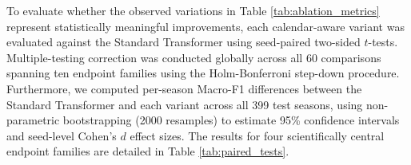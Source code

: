\documentclass[runningheads]{llncs}
\begin{document}
\begin{table}[h!]
\centering
\caption{Ten-seed ablation metrics (mean $\pm$ sample standard deviation) across calendar-aware variants on the 399-season test partition.}
\label{tab:ablation_metrics}
\end{table}

To evaluate whether the observed variations in Table \ref{tab:ablation_metrics} represent statistically meaningful improvements, each calendar-aware variant was evaluated against the Standard Transformer using seed-paired two-sided $t$-tests. Multiple-testing correction was conducted globally across all 60 comparisons spanning ten endpoint families using the Holm-Bonferroni step-down procedure. Furthermore, we computed per-season Macro-F1 differences between the Standard Transformer and each variant across all 399 test seasons, using non-parametric bootstrapping (2000 resamples) to estimate 95\% confidence intervals and seed-level Cohen's $d$ effect sizes. The results for four scientifically central endpoint families are detailed in Table \ref{tab:paired_tests}.
\end{document}
